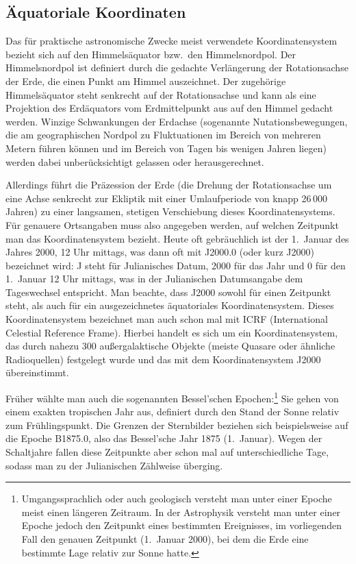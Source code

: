 \subsection{\"Aquatoriale Koordinaten}

Das f\"ur praktische astronomische 
Zwecke meist verwendete Koordinatensystem bezieht 
sich
auf den Himmels\"aquator bzw.\ den Himmelsnordpol. Der Himmelsnordpol
ist definiert durch die gedachte Verl\"angerung der Rotationsachse der Erde, die einen Punkt
am Himmel auszeichnet. Der zugeh\"orige Himmels\"aquator steht senkrecht auf der Rotationsachse
und kann als eine Projektion des Erd\"aquators vom Erdmittelpunkt aus auf den
Himmel gedacht werden. Winzige Schwankungen der Erdachse (sogenannte Nutationsbewegungen,
die am geographischen Nordpol zu Fluktuationen im Bereich von mehreren Metern f\"uhren k\"onnen
und im Bereich von Tagen bis wenigen Jahren liegen) werden
dabei unber\"ucksichtigt gelassen oder herausgerechnet. 

Allerdings f\"uhrt die Pr\"azession der Erde
(die Drehung der Rotationsachse um eine Achse senkrecht zur Ekliptik mit einer
Umlaufperiode von knapp 26\,000 Jahren) zu einer langsamen, stetigen Verschiebung dieses Koordinatensystems. 
F\"ur genauere Ortsangaben muss also angegeben werden, auf welchen Zeitpunkt man das
Koordinatensystem bezieht. Heute oft gebr\"auchlich ist der 1.\ Januar des Jahres 2000, 12 Uhr mittags,
was dann oft mit J2000.0 (oder kurz J2000) bezeichnet wird: 
J steht f\"ur Julianisches Datum, 2000 f\"ur das Jahr und
0 f\"ur den 1.\ Januar 12 Uhr mittags, was in der Julianischen Datumsangabe dem Tageswechsel entspricht. 
Man beachte, dass J2000 sowohl f\"ur einen Zeitpunkt steht, als auch f\"ur ein ausgezeichnetes 
\"aquatoriales Koordinatensystem. Dieses Koordinatensystem bezeichnet man auch schon mal mit 
ICRF 
(International Celestial Reference Frame). Hierbei handelt es sich um ein Koordinatensystem, das durch
nahezu 300 au\ss ergalaktische Objekte (meiste Quasare oder \"ahnliche Radioquellen) festgelegt wurde und
das mit dem Koordinatensystem J2000 \"ubereinstimmt.

Fr\"uher w\"ahlte man 
auch die sogenannten 
Bessel'schen Epochen:\footnote{Umgangssprachlich oder auch geologisch versteht
man unter einer Epoche meist einen l\"angeren Zeitraum. In der Astrophysik versteht man unter einer
Epoche jedoch den Zeitpunkt eines bestimmten Ereignisses, im vorliegenden Fall den genauen 
Zeitpunkt (1.\ Januar 2000),
bei dem die Erde eine bestimmte Lage relativ zur Sonne hatte.} 
Sie gehen von einem exakten tropischen Jahr aus,
definiert durch den Stand der Sonne relativ zum Fr\"uhlingspunkt. 
Die Grenzen der Sternbilder beziehen sich beispielsweise auf die Epoche B1875.0, also das Bessel'sche Jahr 1875
(1.\ Januar).  Wegen der Schaltjahre fallen diese Zeitpunkte
aber schon mal auf unterschiedliche Tage, sodass man zu der Julianischen Z\"ahlweise \"uberging. 

